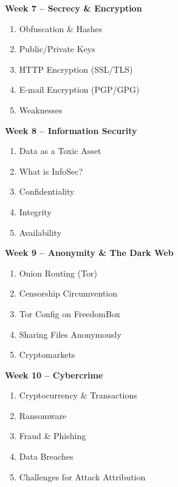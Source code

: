 \documentclass[11pt, a4paper]{article}
\begin{document}
\vspace*{.1in}
\noindent\textbf{Week 7 -- Secrecy \& Encryption}
\begin{enumerate}
\item Obfuscation \& Hashes
\item Public/Private Keys
\item HTTP Encryption (SSL/TLS)
\item E-mail Encryption (PGP/GPG)
\item Weaknesses
\end{enumerate}

\vspace*{.1in}
\noindent\textbf{Week 8 -- Information Security}
\begin{enumerate}
\item Data as a Toxic Asset %
\item What is InfoSec?
\item Confidentiality
\item Integrity
\item Availability
\end{enumerate}

\vspace*{.1in}
\noindent\textbf{Week 9 -- Anonymity \& The Dark Web}
\begin{enumerate}
\item Onion Routing (Tor)
\item Censorship Circumvention
\item Tor Config on FreedomBox
\item Sharing Files Anonymously
\item Cryptomarkets
\end{enumerate}

\vspace*{.1in}
\noindent\textbf{Week 10 -- Cybercrime}
\begin{enumerate}
\item Cryptocurrency \& Transactions %
\item Ransomware
\item Fraud \& Phishing
\item Data Breaches
\item Challenges for Attack Attribution
\end{enumerate}
\end{document}
